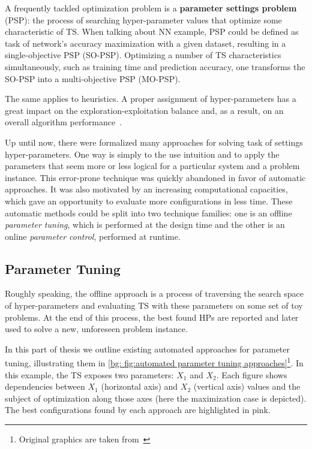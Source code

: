 A frequently tackled optimization problem is a \textbf{parameter settings problem} (PSP): the process of searching hyper-parameter values that optimize some characteristic of TS. When talking about NN example, PSP could be defined as task of network's accuracy maximization with a given dataset, resulting in a single-objective PSP (SO-PSP). Optimizing a number of TS characteristics simultaneously, such as training time and prediction accuracy, one transforms the SO-PSP into a multi-objective PSP (MO-PSP).

The same applies to heuristics. A proper assignment of hyper-parameters has a great impact on the exploration-exploitation balance and, as a result, on an overall algorithm performance~\cite{lavesson2006quantifying}.

Up until now, there were formalized many approaches for solving task of settings hyper-parameters. 
One way is simply to the use intuition and to apply the parameters that seem more or less logical for a particular system and a problem instance. This error-prone technique was quickly abandoned in favor of automatic approaches. It was also motivated by an increasing computational capacities, which gave an opportunity to evaluate more configurations in less time. These automatic methods could be split into two technique families: one is an offline \emph{parameter tuning}, which is performed at the design time and the other is an online \emph{parameter control}, performed at runtime.


\subsection{Parameter Tuning}\label{bg: parameter tuning}
Roughly speaking, the offline approach is a process of traversing the search space of hyper-parameters and evaluating TS with these parameters on some set of toy problems. At the end of this process, the best found HPs are reported and later used to solve a new, unforeseen problem instance.

In this part of thesis we outline existing automated approaches for parameter tuning, illustrating them in \cref{bg: fig:automated parameter tuning approaches}\footnote{Original graphics are taken from~\cite{koch2017automated}}. In this example, the TS exposes two parameters: $X_1$ and $X_2$. Each figure shows dependencies between $X_1$ (horizontal axis) and $X_2$ (vertical axis) values and the subject of optimization along those axes (here the maximization case is depicted). The best configurations found by each approach are highlighted in pink.


